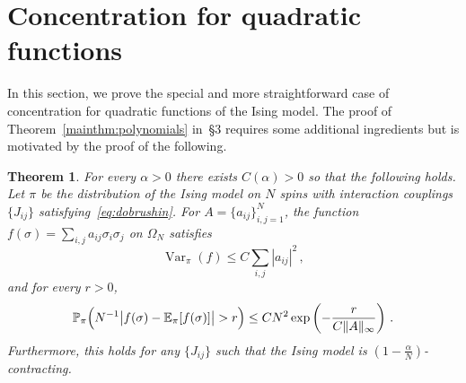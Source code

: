 \documentclass[reqno,11pt]{amsart}
\numberwithin{equation}{section}
\newtheorem{theorem}{Theorem}[section]
\theoremstyle{definition}{
\newtheorem{example}[theorem]{Example}
\newtheorem{definition}[theorem]{Definition}
\newtheorem*{definition*}{Definition}
\newtheorem{problem}[theorem]{Problem}
\newtheorem{question}[theorem]{Question}
\newtheorem{remark}[theorem]{Remark}
}
\newcommand{\E}{\mathbb E}
\renewcommand{\P}{\mathbb P}
\DeclareMathOperator{\var}{Var}
\begin{document}

\section{Concentration for quadratic functions}

In this section, we prove the special and more straightforward case of concentration for quadratic functions of the Ising model. The proof of Theorem~\ref{mainthm:polynomials} in~\S3 requires some additional ingredients but is motivated by the proof of the following.

\begin{theorem}\label{thm:quadratic}
For every $\alpha>0$ there exists $C(\alpha)>0$ so that the following holds. 
Let 
 $\pi$ be the distribution of the Ising model on $N$ spins with interaction couplings $\{J_{i j}\}$ satisfying~\eqref{eq:dobrushin}.
For  $A=\{a_{ij}\}_{i,j=1}^N$, the function $ f(\sigma) = \sum_{i,j} a_{ij} \sigma_i \sigma_j $ on $\Omega_N$
satisfies
\begin{equation}\label{eq:var-bound-quadratic}
 \var_\pi(f) \leq  C \sum_{i,j} |a_{ij}|^2\,, 	
\end{equation}
and for every $r>0$,
\begin{equation}\label{eq:tail-quadratic}\P_\pi \Bigl (N^{-1} \big|f(\sigma)-\E_{\pi}[f(\sigma)]\big|> r \Bigr) \leq C N^2 \exp\left(-\frac{r}{C \|A\|_\infty}\right)\,.	
\end{equation}
Furthermore, this holds for any  $\{J_{ij}\}$ such that the Ising model is $(1-\tfrac{\alpha}N)$-contracting.
\end{theorem}
\end{document}
